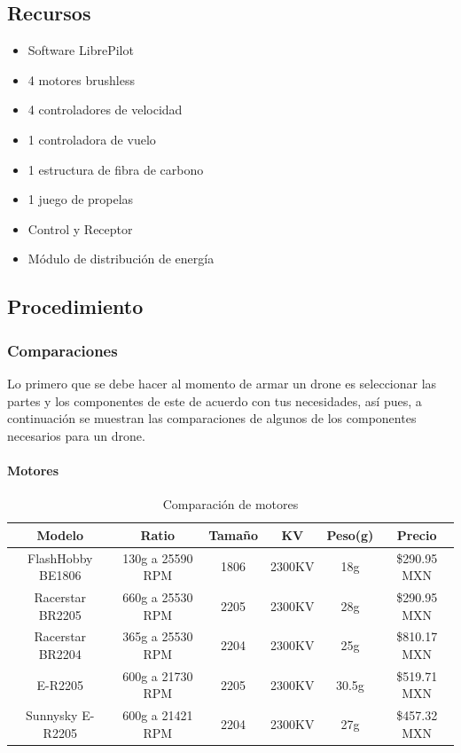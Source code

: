 \documentclass[pdflatex,sn-mathphys-num]{sn-jnl}%
\begin{document}
\subsection{Recursos}
\begin{itemize}
    \item Software LibrePilot
    \item 4 motores brushless
    \item 4 controladores de velocidad
    \item 1 controladora de vuelo
    \item 1 estructura de fibra de carbono
    \item 1 juego de propelas
    \item Control y Receptor
    \item Módulo de distribución de energía
\end{itemize}

\subsection{Procedimiento}

\subsubsection{Comparaciones}

Lo primero que se debe hacer al momento de armar un drone es seleccionar las partes y los componentes de este de acuerdo con tus necesidades, así pues, a continuación se muestran las comparaciones de algunos de los componentes necesarios para un drone.

\paragraph{Motores}

\begin{table}[!h]
\centering
\caption{Comparación de motores}
\label{tab:motors_comparison}
\begin{tabular}{|c|c|c|c|c|c|}
\hline
\textbf{Modelo} & \textbf{Ratio} & \textbf{Tamaño} & \textbf{KV} & \textbf{Peso(g)} & \textbf{Precio} \\
\hline
FlashHobby BE1806 & 130g a 25590 RPM & 1806 & 2300KV & 18g & \$290.95 MXN \\
\hline
Racerstar BR2205 & 660g a 25530 RPM & 2205 & 2300KV & 28g & \$290.95 MXN \\
\hline
Racerstar BR2204 & 365g a 25530 RPM & 2204 & 2300KV & 25g & \$810.17 MXN \\
\hline
E-R2205 & 600g a 21730 RPM & 2205 & 2300KV & 30.5g & \$519.71 MXN \\
\hline
Sunnysky E-R2205 & 600g a 21421 RPM & 2204 & 2300KV & 27g & \$457.32 MXN \\
\hline
\end{tabular}
\end{table}
\end{document}
